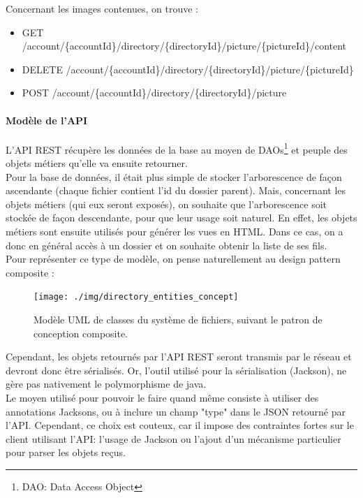 Concernant les images contenues, on trouve :
\begin{itemize}
\item GET /account/\{accountId\}/directory/\{directoryId\}/picture/\{pictureId\}/content
\item DELETE /account/\{accountId\}/directory/\{directoryId\}/picture/\{pictureId\}
\item POST /account/\{accountId\}/directory/\{directoryId\}/picture
\end{itemize}

\paragraph*{Modèle de l'API\\}
L'API REST récupère les données de la base au moyen de DAOs\footnote{DAO: Data Access Object} et peuple des objets métiers qu'elle va ensuite retourner.\\

Pour la base de données, il était plus simple de stocker l'arborescence de façon ascendante (chaque fichier contient l'id du dossier parent). Mais, concernant les objets métiers (qui eux seront exposés), on souhaite que l'arborescence soit stockée de façon descendante, pour que leur usage soit naturel.
En effet, les objets métiers sont ensuite utilisés pour générer les vues en HTML. Dans ce cas, on a donc en général accès à un dossier et on souhaite obtenir la liste de ses fils. \\

Pour représenter ce type de modèle, on pense naturellement au design pattern composite \cite{bib:compositePattern} : \\
\begin{figure}[H]
  \centering
  \texttt{[image: ./img/directory\_entities\_concept]}
  \caption{\label{fig:mb_va_ast} Modèle UML de classes du système de fichiers, suivant le patron de conception composite.}
\end{figure}

Cependant, les objets retournés par l'API REST seront transmis par le réseau et devront donc être sérialisés. Or, l'outil utilisé pour la sérialisation (Jackson), ne gère pas nativement le polymorphisme de java. \\
Le moyen utilisé pour pouvoir le faire quand même consiste à utiliser des annotations Jacksons, ou à inclure un champ "type" dans le JSON retourné par l'API. Cependant, ce choix est couteux, car il impose des contraintes fortes sur le client utilisant l'API: l'usage de Jackson ou l'ajout d'un mécanisme particulier pour parser les objets reçus.\\

